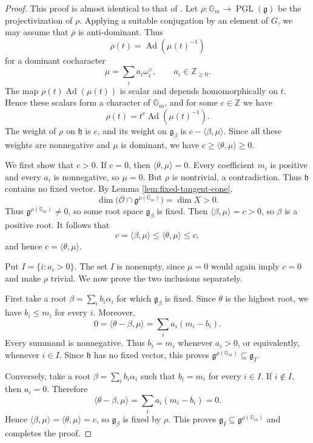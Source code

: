 \documentclass[12pt]{article}
\theoremstyle{remark}
\theoremstyle{plain}
\DeclareMathOperator{\Ad}{Ad}
\newcommand{\Gm}{\mathbb G_m}
\begin{document}
\begin{proof}
This proof is almost identical to that of
\cite[Lemma 3.3]{Jia}.
Let $\overline\rho:\Gm\to\operatorname{PGL}(\mathfrak g)$ be the
projectivization of $\rho$.
Applying a suitable conjugation by an element of $G$, we may assume that
$\overline\rho$ is anti-dominant. Thus
\[
\overline\rho(t)=\Ad(\mu(t)^{-1})
\]
for a dominant cocharacter
\[
\mu=\sum_i a_i\omega_i^\vee,
\qquad
a_i\in\mathbb Z_{\geq0}.
\]
The map $\rho(t)\Ad(\mu(t))$ is scalar and depends homomorphically on
$t$. Hence these scalars form a character of $\Gm$, and for some
$c\in\mathbb Z$ we have
\[
\rho(t)=t^c\Ad(\mu(t)^{-1}).
\]
The weight of $\rho$ on $\mathfrak h$ is $c$, and its weight on
$\mathfrak g_\beta$ is $c-\langle\beta,\mu\rangle$. Since all these
weights are nonnegative and $\mu$ is dominant, we have
$c\geq\langle\theta,\mu\rangle\geq0$.

We first show that $c>0$. If $c=0$, then
$\langle\theta,\mu\rangle=0$. Every coefficient $m_i$ is positive and
every $a_i$ is nonnegative, so $\mu=0$. But $\rho$ is nontrivial, a
contradiction. Thus $\mathfrak h$ contains no fixed vector.
By Lemma \ref{lem:fixed-tangent-cone},
\[
\dim\bigl(\overline{\mathcal O}\cap
\mathfrak g^{\rho(\Gm)}\bigr)=\dim X>0.
\]
Thus $\mathfrak g^{\rho(\Gm)}\ne0$, so some root space
$\mathfrak g_\beta$ is fixed. Then
$\langle\beta,\mu\rangle=c>0$, so $\beta$ is a positive root.
It follows that
\[
c=\langle\beta,\mu\rangle
\leq\langle\theta,\mu\rangle\leq c,
\]
and hence $c=\langle\theta,\mu\rangle$.

Put $I=\{i:a_i>0\}$. The set $I$ is nonempty, since $\mu=0$ would
again imply $c=0$ and make $\rho$ trivial. We now prove the two
inclusions separately.

First take a root $\beta=\sum_i b_i\alpha_i$ for which
$\mathfrak g_\beta$ is fixed. Since $\theta$ is the highest root, we have
$b_i\leq m_i$ for every $i$. Moreover,
\[
0=\langle\theta-\beta,\mu\rangle
=\sum_i a_i(m_i-b_i).
\]
Every summand is nonnegative. Thus $b_i=m_i$ whenever $a_i>0$, or
equivalently, whenever $i\in I$. Since $\mathfrak h$ has no fixed
vector, this proves
$\mathfrak g^{\rho(\Gm)}\subseteq\mathfrak g_I$.

Conversely, take a root $\beta=\sum_i b_i\alpha_i$ such that
$b_i=m_i$ for every $i\in I$. If $i\notin I$, then $a_i=0$. Therefore
\[
\langle\theta-\beta,\mu\rangle
=\sum_i a_i(m_i-b_i)=0.
\]
Hence $\langle\beta,\mu\rangle=\langle\theta,\mu\rangle=c$, so
$\mathfrak g_\beta$ is fixed by $\rho$. This proves
$\mathfrak g_I\subseteq\mathfrak g^{\rho(\Gm)}$ and completes the proof.
\end{proof}
\end{document}
